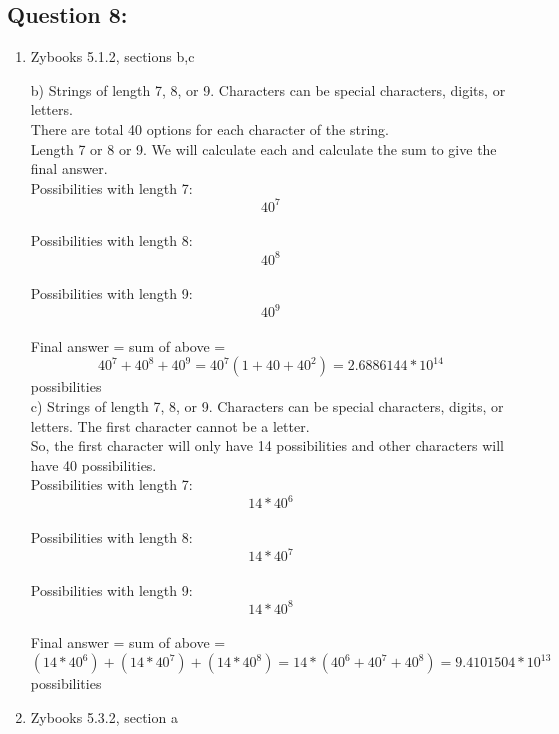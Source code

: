 \documentclass[14pt]{extreport}
\begin{document}
\subsection*{Question 8:}

\begin{enumerate}[label=(\alph*)]

\item  Zybooks 5.1.2, sections b,c
\newline

b) Strings of length 7, 8, or 9. Characters can be special characters, digits, or letters.\\
There are total 40 options for each character of the string.\\

Length 7 or 8 or 9. We will calculate each and calculate the sum to give the final answer.\\

Possibilities with length 7: \[40^{7} \]  \\

Possibilities with length 8: \[40^{8} \] \\

Possibilities with length 9: \[40^{9} \] \\

Final answer = sum of above = \[40^{7} + 40^{8} + 40^{9} = 40^{7} (1+40+40^{2}) = 2.6886144 * 10^{14} \] possibilities\\


c) Strings of length 7, 8, or 9. Characters can be special characters, digits, or letters. The first character cannot be a letter.\\
So, the first character will only have 14 possibilities and other characters will have 40 possibilities.\\

Possibilities with length 7: \[14 * 40^{6} \]  \\

Possibilities with length 8: \[14 * 40^{7} \] \\

Possibilities with length 9: \[14 * 40^{8} \] \\

Final answer = sum of above = \[(14 * 40^{6}) + (14 * 40^{7}) + (14 * 40^{8}) = 14*(40^{6} + 40^{7} + 40^{8}) = 9.4101504 * 10^{13} \] possibilities\\


\item Zybooks 5.3.2, section a
\newline


\end{enumerate}
\end{document}
